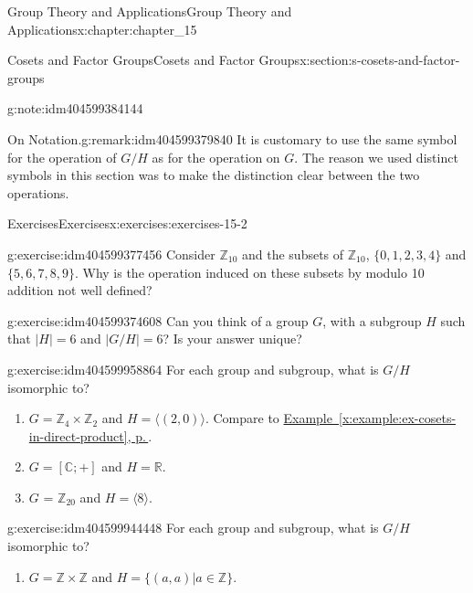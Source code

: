 \documentclass[twoside,10pt,]{book}
\newcommand{\xreffont}{\relax}
\numberwithin{equation}{section}
\begin{document}
\begin{chapterptx}{Group Theory and Applications}{}{Group Theory and Applications}{}{}{x:chapter:chapter_15}
\begin{sectionptx}{Cosets and Factor Groups}{}{Cosets and Factor Groups}{}{}{x:section:s-cosets-and-factor-groups}
\begin{note}{}{g:note:idm404599384144}
\end{note}
\begin{remark}{On Notation.}{g:remark:idm404599379840}%
It is customary to use the same symbol for the operation of \(G/H\) as for the operation on \(G\).  The reason we used distinct symbols in this section was to make the distinction clear between the two operations.%
\end{remark}
%
%
\typeout{************************************************}
\typeout{************************************************}
%
\begin{exercises-subsection}{Exercises}{}{Exercises}{}{}{x:exercises:exercises-15-2}
\begin{divisionexercise}{1}{}{}{g:exercise:idm404599377456}%
Consider \(\mathbb{Z}_{10}\) and the subsets of \(\mathbb{Z}_{10}\), \(\{0, 1, 2, 3, 4\}\) and \(\{5, 6, 7, 8, 9\}\). Why is the operation induced on these subsets by modulo 10 addition not well defined?%
\end{divisionexercise}%
\begin{divisionexercise}{2}{}{}{g:exercise:idm404599374608}%
Can you think of a group \(G\), with a subgroup \(H\) such that \(\lvert H\rvert  = 6\) and \(\lvert G/H\rvert  = 6\)? Is your answer unique?%
\end{divisionexercise}%
\begin{divisionexercise}{3}{}{}{g:exercise:idm404599958864}%
For each group and subgroup, what is \(G/H\) isomorphic to?%
\begin{enumerate}[label=(\alph*)]
\item{}\(G = \mathbb{Z}_4 \times \mathbb{Z}_2\)  and  \(H = \langle (2, 0)\rangle\). Compare to \hyperref[x:example:ex-cosets-in-direct-product]{Example~{\xreffont\ref{x:example:ex-cosets-in-direct-product}}, p.\,\pageref{x:example:ex-cosets-in-direct-product}}.%
\item{}\(G = [\mathbb{C}; +]\)  and \(H = \mathbb{R}\).%
\item{}\(G\) = \(\mathbb{Z}_{20}\)  and  \(H = \langle 8\rangle\).%
\end{enumerate}
%
\end{divisionexercise}%
\begin{divisionexercise}{4}{}{}{g:exercise:idm404599944448}%
For each group and subgroup, what is \(G/H\) isomorphic to?%
\begin{enumerate}[label=(\alph*)]
\item{}\(G = \mathbb{Z}\times \mathbb{Z}\) and  \(H = \{(a, a) | a \in  \mathbb{Z}\}\).%

\end{enumerate}
\end{divisionexercise}
\end{exercises-subsection}
\end{sectionptx}
\end{chapterptx}
\end{document}
